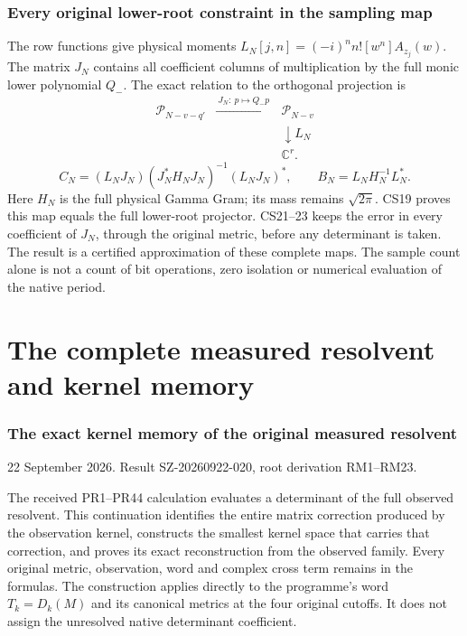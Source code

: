 \documentclass[11pt]{article}
\begin{document}
\section*{Every original lower-root constraint in the sampling map}
The row functions give physical moments
$L_N[j,n]=(-i)^nn![w^n]A_{z_j}(w)$. The matrix $J_N$ contains all coefficient
columns of multiplication by the full monic lower polynomial $Q_-$.
The exact relation to the orthogonal projection is
\[
 \begin{array}{ccc}
 \mathcal P_{N-v-q'}&\xrightarrow{\ J_N:\ p\mapsto Q_-p\ }&\mathcal P_{N-v}\\
 &&\downarrow L_N\\
 &&\mathbb C^r.
 \end{array}
\]
\[
 C_N=(L_NJ_N)(J_N^*H_NJ_N)^{-1}(L_NJ_N)^*,\qquad
 B_N=L_NH_N^{-1}L_N^*.
\]
Here $H_N$ is the full physical Gamma Gram; its mass remains $\sqrt{2\pi}$.
CS19 proves this map equals the full lower-root projector. CS21--23 keeps
the error in every coefficient of $J_N$, through the original metric,
before any determinant is taken. The result is a certified approximation
of these complete maps. The sample count alone is not a count of bit
operations, zero isolation or numerical evaluation of the native period.
\clearpage

\clearpage\part{The complete measured resolvent and kernel memory}
\section{The exact kernel memory of the original measured resolvent}\label{the-exact-kernel-memory-of-the-original-measured-resolvent}

22 September 2026. Result SZ-20260922-020, root derivation RM1--RM23.

The received PR1--PR44 calculation evaluates a determinant of the full observed resolvent. This continuation identifies the entire matrix correction produced by the observation kernel, constructs the smallest kernel space that carries that correction, and proves its exact reconstruction from the observed family. Every original metric, observation, word and complex cross term remains in the formulas. The construction applies directly to the programme's word \(T_k=D_k(M)\) and its canonical metrics at the four original cutoffs. It does not assign the unresolved native determinant coefficient.
\end{document}
